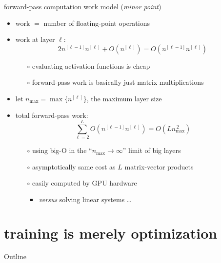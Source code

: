 \documentclass[xcolor={svgnames},
               hyperref={colorlinks,citecolor=DeepPink4,linkcolor=FireBrick,urlcolor=Maroon}]
               {beamer}
\begin{document}
\begin{frame}{forward-pass computation work model (\emph{minor point})}

\begin{itemize}
\item \alert{work} $=$ number of floating-point operations
\item work at layer $\ell$:
    $$2 n^{[\ell-1]} n^{[\ell]} + O(n^{[\ell]}) = O(n^{[\ell-1]} n^{[\ell]})$$

    \begin{itemize}
    \item[$\circ$] evaluating activation functions is cheap
    \item[$\circ$] forward-pass work is basically just matrix multiplications
    \end{itemize}
\item let $n_{\text{max}} =\max\{n^{[\ell]}\}$, the maximum layer size
\item total forward-pass work:
    $$\sum_{\ell=2}^L O(n^{[\ell-1]} n^{[\ell]}) = O(L n_{\text{max}}^{\,2})$$

    \begin{itemize}
    \item[$\circ$] using big-O in the ``$n_{\text{max}} \to \infty$'' limit of big layers
    \item[$\circ$] asymptotically same cost as $L$ matrix-vector products
    \item[$\circ$] easily computed by GPU hardware
        \begin{itemize}
        \item \emph{versus} solving linear systems \dots
        \end{itemize}
    \end{itemize}
\end{itemize}
\end{frame}


\section{training is merely optimization}

\begin{frame}{Outline}
\end{frame}
\end{document}

